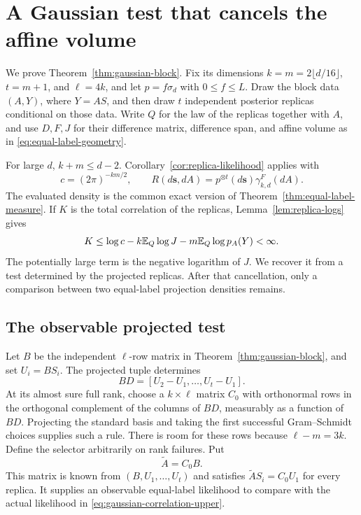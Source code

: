 \section{A Gaussian test that cancels the affine volume}
\label{sec:gaussian}

We prove Theorem~\ref{thm:gaussian-block}. Fix its dimensions
$k=m=2\lfloor d/16\rfloor$, $t=m+1$, and $\ell=4k$, and let
$p=f\sigma_d$ with $0\le f\le L$. Draw the block data $(A,Y)$, where
$Y=AS$, and then draw $t$ independent posterior replicas conditional on
those data. Write $Q$ for the law of the replicas together with $A$,
and use $D,F,J$ for their difference matrix, difference span, and affine
volume as in \eqref{eq:equal-label-geometry}.

For large $d$, $k+m\le d-2$. Corollary~\ref{cor:replica-likelihood} applies
with
\[
 c=(2\pi)^{-km/2},\qquad
 R(d\mathbf s,dA)=p^{\otimes t}(d\mathbf s)\gamma_{k,d}^{F}(dA).
\]
The evaluated density is the common exact version of
Theorem~\ref{thm:equal-label-measure}. If $K$ is the total correlation
of the replicas, Lemma~\ref{lem:replica-logs} gives
\begin{equation}\label{eq:gaussian-correlation-upper}
 K\le\log c-k\mathbb E_Q\log J-m\mathbb E_Q\log p_A(Y)<\infty.
\end{equation}
The potentially large term is the negative logarithm of $J$. We recover
it from a test determined by the projected replicas. After that cancellation,
only a comparison between two equal-label projection densities remains.

\subsection{The observable projected test}

Let $B$ be the independent $\ell$-row matrix in
Theorem~\ref{thm:gaussian-block}, and set $U_i=BS_i$. The projected tuple
determines
\[
 BD=[U_2-U_1,\ldots,U_t-U_1].
\]
At its almost sure full rank, choose a $k\times\ell$ matrix $C_0$ with
orthonormal rows in the orthogonal complement of the columns of $BD$,
measurably as a function of $BD$. Projecting the standard basis and taking
the first successful Gram--Schmidt choices supplies such a rule.
There is room for these rows because $\ell-m=3k$. Define the selector
arbitrarily on rank failures. Put
\[
 \widetilde A=C_0B.
\]
This matrix is known from $(B,U_1,\ldots,U_t)$ and satisfies
$\widetilde A S_i=C_0U_1$ for every replica. It supplies an observable
equal-label likelihood to compare with the actual likelihood in
\eqref{eq:gaussian-correlation-upper}.

